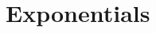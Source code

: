\documentclass{book}
\begin{document}
	
	
	
	
	
	
	
	
	
	
	
	
	
	
	
	
	
	
	
	
	
	
	
	
	
	
	
	
	
	
	
	\newpage
	\section{Exponentials}
	
\end{document}
